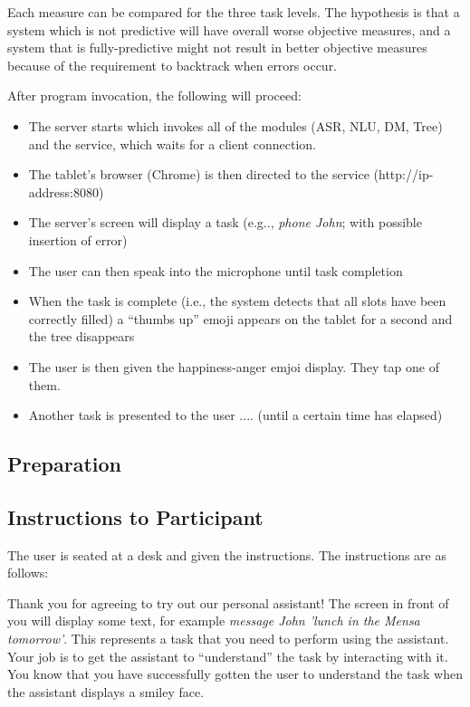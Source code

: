 \documentclass[a4paper,10pt]{article}
\begin{document}
Each measure can be compared for the three task levels. The hypothesis is that a system which is not predictive will have overall worse objective measures, and a system that is fully-predictive might not result in better objective measures because of the requirement to backtrack when errors occur. 


After program invocation, the following will proceed:

\begin{itemize}
 \item The server starts which invokes all of the modules (ASR, NLU, DM, Tree) and the service, which waits for a client connection. 
 \item The tablet's browser (Chrome) is then directed to the service (http://ip-address:8080)
 \item The server's screen will display a task (e.g.., \emph{phone John}; with possible insertion of error)
 \item The user can then speak into the microphone until task completion
 \item When the task is complete (i.e., the system detects that all slots have been correctly filled) a ``thumbs up'' emoji appears on the tablet for a second and the tree disappears
 \item The user is then given the happiness-anger emjoi display. They tap one of them. 
 \item Another task is presented to the user .... (until a certain time has elapsed)
\end{itemize}



\subsection{Preparation}



\subsection{Instructions to Participant}

The user is seated at a desk and given the instructions. The instructions are as follows:

Thank you for agreeing to try out our personal assistant! The screen in front of you will display some text, for example \emph{message John 'lunch in the Mensa tomorrow'}. This represents a task that you need to perform using the assistant. Your job is to get the assistant to ``understand'' the task by interacting with it. You know that you have successfully gotten the user to understand the task when the assistant displays a smiley face. 
\end{document}
